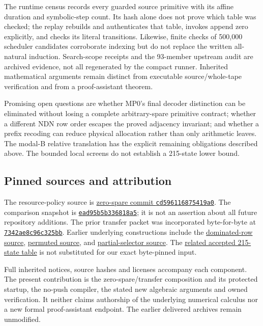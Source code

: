 \documentclass[11pt]{article}
\begin{document}
The runtime census records every guarded source primitive with its affine duration and symbolic-step count. Its hash alone does not prove which table was checked; the replay rebuilds and authenticates that table, invokes append zero explicitly, and checks its literal transitions. Likewise, finite checks of 500,000 scheduler candidates corroborate indexing but do not replace the written all-natural induction. Search-scope receipts and the 93-member upstream audit are archived evidence, not all regenerated by the compact runner. Inherited mathematical arguments remain distinct from executable source/whole-tape verification and from a proof-assistant theorem.

Promising open questions are whether MP0's final decoder distinction can be eliminated without losing a complete arbitrary-spare primitive contract; whether a different NDN row order escapes the proved adjacency invariant; and whether a prefix recoding can reduce physical allocation rather than only arithmetic leaves. The modal-B relative translation has the explicit remaining obligations described above. The bounded local screens do not establish a 215-state lower bound.

\subsection*{Pinned sources and attribution}
The resource-policy source is \href{https://github.com/VladimirReshetnikov/ProveIt/commit/cd596116875419a0cc1b0665cc1c58c7b9f5a135}{zero-spare commit \texttt{cd596116875419a0}}. The comparison snapshot is \href{https://github.com/VladimirReshetnikov/ProveIt/commit/ead95b5b336818a53c89b8c3d5249822e0570939}{\texttt{ead95b5b336818a5}}; it is not an assertion about all future repository additions. The prior transfer packet was incorporated byte-for-byte at \href{https://github.com/VladimirReshetnikov/ProveIt/commit/7342ae8c96c325bb8340291f43d7573866a77cd7}{\texttt{7342ae8c96c325bb}}. Earlier underlying constructions include the \href{https://github.com/VladimirReshetnikov/ProveIt/commit/7071e5041ee316d087661b658362feed159901ef}{dominated-row source}, \href{https://github.com/VladimirReshetnikov/ProveIt/commit/d59b4418821c598c4703f0a60b1f7cbae4f3bcf6}{permuted source}, and \href{https://github.com/VladimirReshetnikov/ProveIt/commit/6ec69081ca2a4abc03c35b573e22eb0d939a6324}{partial-selector source}. The \href{https://github.com/VladimirReshetnikov/ProveIt/commit/a61476422532a5d3b7dec11fc7a92751fe0d60f8}{related accepted 215-state table} is not substituted for our exact byte-pinned input.

Full inherited notices, source hashes and licenses accompany each component. The present contribution is the zero-spare/transfer composition and its protected startup, the no-push compiler, the stated new algebraic arguments and owned verification. It neither claims authorship of the underlying numerical calculus nor a new formal proof-assistant endpoint. The earlier delivered archives remain unmodified.
\end{document}
